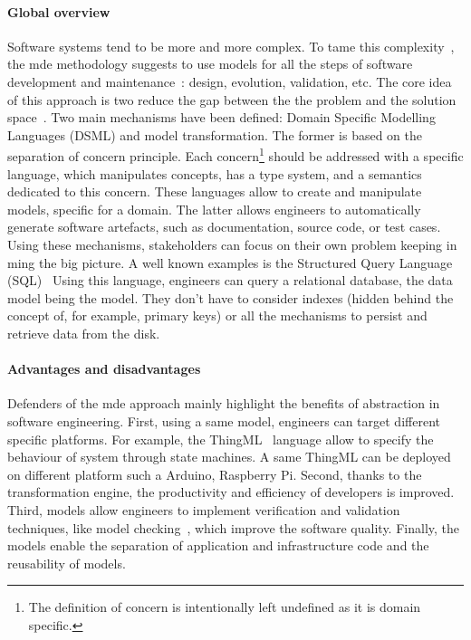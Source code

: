 \paragraph{Global overview}    
Software systems tend to be more and more complex.
To tame this complexity~\cite{DBLP:conf/icse/FranceR07, DBLP:journals/computer/Schmidt06}, the \gls{mde} methodology suggests  to use \glspl{model} for all the steps of software development and maintenance~\cite{DBLP:journals/computer/Schmidt06, DBLP:series/synthesis/2017Brambilla, DBLP:conf/icse/HutchinsonRW11, DBLP:conf/uml/BakerLW05, DBLP:conf/icse/HutchinsonWRK11, DBLP:journals/software/AtkinsonK03a}: design, evolution, validation, etc.
The core idea of this approach is two reduce the gap between the the problem and the solution space~\cite{DBLP:journals/computer/Schmidt06}.
Two main mechanisms have been defined: Domain Specific Modelling Languages (DSML) and model transformation.
The former is based on the separation of concern principle.
Each concern\footnote{The definition of concern is intentionally left undefined as it is domain specific.} should be addressed with a specific language, which manipulates concepts, has a type system, and a semantics dedicated to this concern.
These languages allow to create and manipulate \glspl{model}, specific for a domain.
The latter allows engineers to automatically generate software artefacts, such as documentation, source code, or test cases.
Using these mechanisms, stakeholders can focus on their own problem keeping in ming the big picture.
A well known examples is the Structured Query Language \linebreak (SQL)~\cite{SQL:Spec}
Using this language, engineers can query a relational database, the data model being the \gls{model}.
They don't have to consider indexes (hidden behind the concept of, for example, primary keys) or all the mechanisms to persist and retrieve data from the disk.

\paragraph{Advantages and disadvantages}
Defenders of the \gls{mde} approach mainly highlight the benefits of abstraction in software engineering\cite{DBLP:journals/computer/Schmidt06, DBLP:conf/ifm/Kent02, DBLP:conf/uml/BakerLW05}.
First, using a same \gls{model}, engineers can target different specific platforms.
For example, the ThingML~\cite{DBLP:conf/models/HarrandFMH16} language allow to specify the behaviour of system through state machines.
A same ThingML can be deployed on different platform such a Arduino, Raspberry Pi.
Second, thanks to the transformation engine, the productivity and efficiency of developers is improved.
Third, \glspl{model} allow engineers to implement verification and validation techniques, like model checking~\cite{DBLP:books/daglib/0020348}, which improve the software quality.
Finally, the \glspl{model} enable the separation of application and infrastructure code and the reusability of \glspl{model}.

